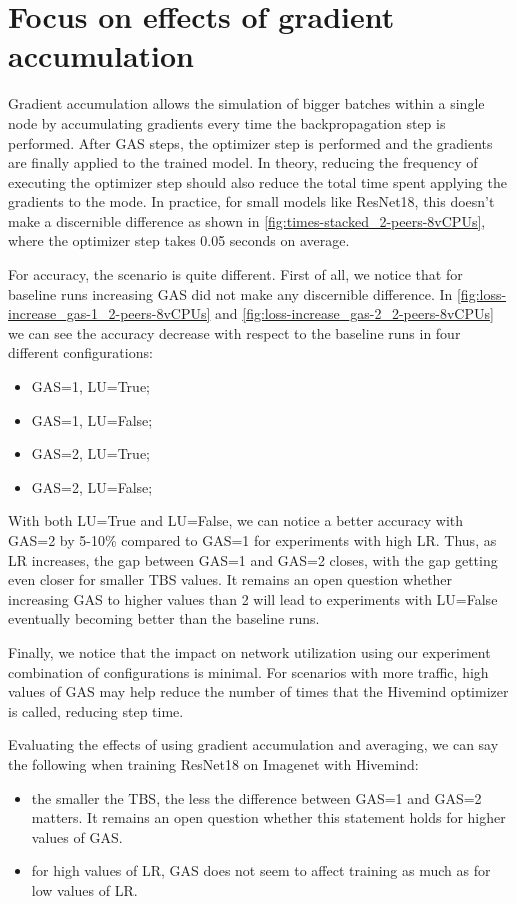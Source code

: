 \section{Focus on effects of gradient accumulation}\label{sec:focus-gradient-acc}

Gradient accumulation allows the simulation of bigger batches within a single node by accumulating gradients every time the backpropagation step is performed.
After GAS steps, the optimizer step is performed and the gradients are finally applied to the trained model.
In theory, reducing the frequency of executing the optimizer step should also reduce the total time spent applying the gradients to the mode.
In practice, for small models like ResNet18, this doesn't make a discernible difference as shown in \autoref{fig:times-stacked_2-peers-8vCPUs}, where the optimizer step takes 0.05 seconds on average.

For accuracy, the scenario is quite different.
First of all, we notice that for baseline runs increasing GAS did not make any discernible difference.
In \autoref{fig:loss-increase_gas-1_2-peers-8vCPUs} and \autoref{fig:loss-increase_gas-2_2-peers-8vCPUs} we can see the accuracy decrease with respect to the baseline runs in four different configurations:
\begin{itemize}
    \item GAS=1, LU=True; 
    \item GAS=1, LU=False;
    \item GAS=2, LU=True;
    \item GAS=2, LU=False;
\end{itemize}

With both LU=True and LU=False, we can notice a better accuracy with GAS=2 by 5-10\% compared to GAS=1 for experiments with high LR.
Thus, as LR increases, the gap between GAS=1 and GAS=2 closes, with the gap getting even closer for smaller TBS values.
It remains an open question whether increasing GAS to higher values than 2 will lead to experiments with LU=False eventually becoming better than the baseline runs.

Finally, we notice that the impact on network utilization using our experiment combination of configurations is minimal.
For scenarios with more traffic, high values of GAS may help reduce the number of times that the Hivemind optimizer is called, reducing step time.

Evaluating the effects of using gradient accumulation and averaging, we can say the following when training ResNet18 on Imagenet with Hivemind:
\begin{itemize}
    \item the smaller the TBS, the less the difference between GAS=1 and GAS=2 matters. It remains an open question whether this statement holds for higher values of GAS.
    \item for high values of LR, GAS does not seem to affect training as much as for low values of LR.
\end{itemize}
